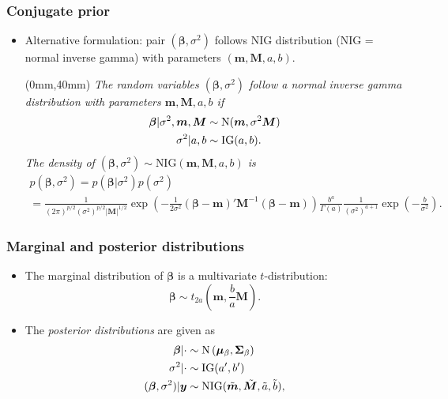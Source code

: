 \documentclass[xcolor=table,10pt]{beamer}
\newenvironment{reference}[2]{%
  \begin{textblock*}{\textwidth}(#1,#2) 
      \footnotesize\it\bgroup\color{red!50!black}}{\egroup\end{textblock*}
}
\begin{document}
\begin{frame}
  \frametitle{Conjugate prior}
  \begin{itemize}
\item Alternative formulation: pair $(\bm\beta, \sigma^2)$
follows \alert{NIG distribution (NIG = normal inverse gamma)} with 
parameters $(\bm m, \bm M, a, b)$.\footnotemark[2]
\vspace*{6\baselineskip}
\begin{reference}{0mm}{40mm}
  The random variables $(\bm \beta, \sigma^2)$ follow a {\em normal
    inverse gamma distribution\/} with parameters $\bm m, \bm M, a, b$
  if 
  \begin{align*}
    \bm \beta|\sigma^2, \bm m, \bm M &\sim {\rm N}(\bm m,
                                         \sigma^2\bm M)\\
    \sigma^2|a, b &\sim \text{IG}(a,b).
  \end{align*}
  The density of $(\bm \beta, \sigma^2)\sim \text{NIG}(\bm m, \bm M,
  a, b)$ is
  \begin{multline*}
    p(\bm \beta,\sigma^2) = p(\bm\beta |\sigma^2) p(\sigma^2) \\
    = \frac{1}{(2\pi)^{p/2} (\sigma^2)^{p/2} \left|\bm
      M\right|^{1/2}} \exp\left( -\frac{1}{2\sigma^2} (\bm \beta-\bm
      m)'\bm M^{-1} (\bm \beta-\bm m)\right) %
      \frac{b^a}{\Gamma(a)} \frac{1}{(\sigma^2)^{a+1}}
      \exp\left(-\frac{b}{\sigma^2}\right). 
  \end{multline*}
\end{reference}
\end{itemize}
\end{frame}

\begin{frame}
  \frametitle{Marginal and posterior distributions}
  \begin{itemize}
  \item The marginal distribution of $\bm\beta$ is a multivariate 
    $t$-distribution: 
    \begin{equation*}
      \bm\beta \sim t_{2a} \left(\bm m, \frac{b}{a} \bm M\right). 
    \end{equation*}
    \vspace*{-\baselineskip}
  \item The {\em posterior distributions\/} are given as
    \begin{align*}
      \bm\beta|\cdot &\sim {\rm N}\left(\bm{\mu}_\beta,
                       \bm{\Sigma}_\beta\right)\\ 
      \sigma^2|\cdot &\sim \text{IG}(a', b')\\
      (\bm\beta, \sigma^2)|\bm y&\sim \text{NIG}(\tilde{\bm m},
                                  \tilde{\bm M}, \tilde a, \tilde b),
    \end{align*}
  \end{itemize}
\end{frame}
\end{document}
